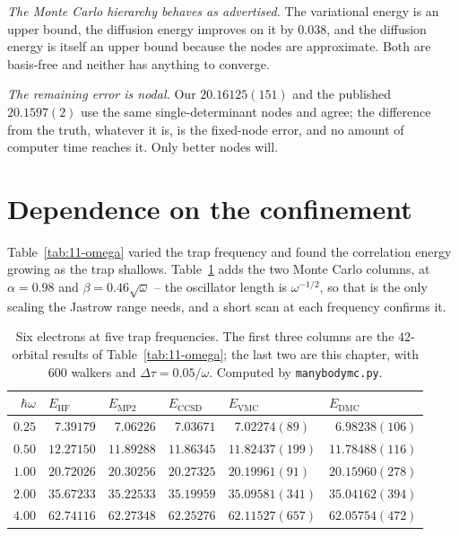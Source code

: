 \emph{The Monte Carlo hierarchy behaves as advertised.}  The variational energy
is an upper bound, the diffusion energy improves on it by $0.038$, and the
diffusion energy is itself an upper bound because the nodes are approximate.
Both are basis-free and neither has anything to converge.

\emph{The remaining error is nodal.}  Our $20.16125(151)$ and the published
$20.1597(2)$ use the same single-determinant nodes and agree; the difference
from the truth, whatever it is, is the fixed-node error, and no amount of
computer time reaches it.  Only better nodes will.

\section{Dependence on the confinement}
\label{sec:appomega}

Table~\ref{tab:11-omega} varied the trap frequency and found the correlation
energy growing as the trap shallows.  Table~\ref{tab:16-omega} adds the two
Monte Carlo columns, at $\alpha=0.98$ and $\beta=0.46\sqrt{\omega}$ -- the
oscillator length is $\omega^{-1/2}$, so that is the only scaling the Jastrow
range needs, and a short scan at each frequency confirms it.

\begin{table}[h]
\centering
\renewcommand{\arraystretch}{1.2}
\setlength{\tabcolsep}{7pt}
\small
\begin{tabular}{rlllll}
\toprule
$\hbar\omega$ & $E_{\mathrm{HF}}$ & $E_{\mathrm{MP2}}$ & $E_{\mathrm{CCSD}}$
  & $E_{\mathrm{VMC}}$ & $E_{\mathrm{DMC}}$\\
\midrule
$0.25$ & $\phantom{0}7.39179$ & $\phantom{0}7.06226$ & $\phantom{0}7.03671$
  & $\phantom{0}7.02274(89)$ & $\phantom{0}6.98238(106)$\\
$0.50$ & $12.27150$ & $11.89288$ & $11.86345$
  & $11.82437(199)$ & $11.78488(116)$\\
$1.00$ & $20.72026$ & $20.30256$ & $20.27325$
  & $20.19961(91)$ & $20.15960(278)$\\
$2.00$ & $35.67233$ & $35.22533$ & $35.19959$
  & $35.09581(341)$ & $35.04162(394)$\\
$4.00$ & $62.74116$ & $62.27348$ & $62.25276$
  & $62.11527(657)$ & $62.05754(472)$\\
\bottomrule
\end{tabular}
\caption{Six electrons at five trap frequencies.  The first three columns are
the $42$-orbital results of Table~\ref{tab:11-omega}; the last two are this
chapter, with $600$ walkers and $\Delta\tau=0.05/\omega$.  Computed by
\texttt{manybodymc.py}.}
\label{tab:16-omega}
\end{table}

